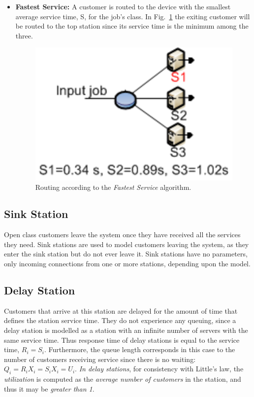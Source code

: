 \begin{itemize}
\item \textbf{Fastest Service:} A customer is routed to the device
with the smallest average service time, S, for the job's class. In
Fig.~\ref{fig:routfastserv} the exiting customer will be routed to
the top station since its service time is the minimum among the
three.
\begin{figure}[htb]
    \begin{center}
        \includegraphics[scale=.5]{img/jsimg/8.14.eps}
    \end{center}
    \caption{Routing according to the \emph{Fastest Service}
    algorithm.}
    \label{fig:routfastserv}
\end{figure}
\end{itemize}

\subsection{Sink Station} Open class customers leave the
system once they have received all the services they need. Sink
stations are used to model customers leaving the system, as they
enter the sink station but do not ever leave it. Sink stations
have no parameters, only incoming connections from one or more
stations, depending upon the model.

\subsection{Delay Station}
\label{dstat} Customers that arrive at this
station are delayed for the amount of time that defines the
station service time. They do not experience any queuing, since a
delay station is modelled as a station with an infinite number of
servers with the same service time. Thus response time of delay
stations is equal to the service time, $R_i = S_i$. Furthermore,
the queue length corresponds in this case to the number of
customers receiving service since there is no waiting: $Q_i = R_i
X_i = S_i X_i = U_i$. \emph{In delay stations}, for consistency
with Little's law, the \emph{utilization} is computed as the
\emph{average number of customers} in the station, and thus it may
be \emph{greater than 1}.

